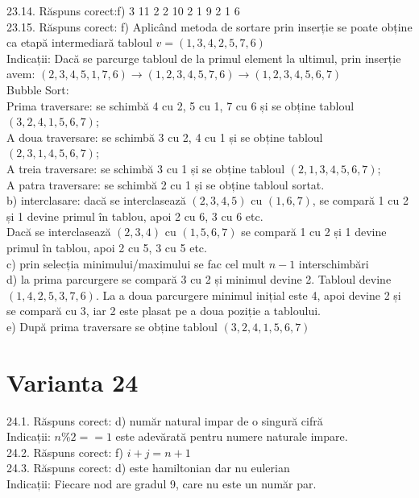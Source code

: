 23.14. Răspuns corect:f) 3 11 2 2 10 2 1 9 2 1 6\\

23.15. Răspuns corect: f) Aplicând metoda de sortare prin inserție se poate obține ca etapă intermediară tabloul $v=(1,3,4,2,5,7,6)$\\
Indicații: Dacă se parcurge tabloul de la primul element la ultimul, prin inserție avem: $(2,3,4,5,1,7,6) \rightarrow (1,2,3,4,5,7,6) \rightarrow (1,2,3,4,5,6,7)$\\ Bubble Sort:\\ Prima traversare: se schimbă 4 cu 2, 5 cu 1, 7 cu 6 și se obține tabloul $(3,2,4,1,5,6,7)$;\\ A doua traversare: se schimbă 3 cu 2, 4 cu 1 și se obține tabloul $(2,3,1,4,5,6,7)$;\\ A treia traversare: se schimbă 3 cu 1 și se obține tabloul $(2,1,3,4,5,6,7)$;\\ A patra traversare: se schimbă 2 cu 1 și se obține tabloul sortat.\\ b) interclasare: dacă se interclasează $(2,3,4,5)$ cu $(1,6,7)$, se compară 1 cu 2 și 1 devine primul în tablou, apoi 2 cu 6, 3 cu 6 etc.\\ Dacă se interclasează $(2,3,4)$ cu $(1,5,6,7)$ se compară 1 cu 2 și 1 devine primul în tablou, apoi 2 cu 5, 3 cu 5 etc.\\ c) prin selecția minimului/maximului se fac cel mult $n - 1$ interschimbări\\ d) la prima parcurgere se compară 3 cu 2 și minimul devine 2. Tabloul devine $(1,4,2,5,3,7,6)$. La a doua parcurgere minimul inițial este 4, apoi devine 2 și se compară cu 3, iar 2 este plasat pe a doua poziție a tabloului.\\ e) După prima traversare se obține tabloul $(3,2,4,1,5,6,7)$\\

\section*{Varianta 24}

24.1. Răspuns corect: d) număr natural impar de o singură cifră\\
Indicații: $n \% 2 == 1$ este adevărată pentru numere naturale impare.\\

24.2. Răspuns corect: f) $i+j=n+1$\\

24.3. Răspuns corect: d) este hamiltonian dar nu eulerian\\
Indicații: Fiecare nod are gradul 9, care nu este un număr par.\\

